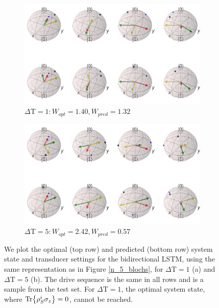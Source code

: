 \begin{figure}
	\centering
	\begin{subfigure}{0.85\textwidth}
		\centering
		\includegraphics[width=\textwidth]{img/bloch_comp_1_crop_sphere}
		\caption{$\Delta \mathrm{T} = 1: W_{opt} = 1.40, W_{pred} = 1.32$}
		\label{}
	\end{subfigure}
	\begin{subfigure}{0.85\textwidth}
		\centering
		\includegraphics[width=\textwidth]{img/bloch_comp_5_crop_sphere}
		\caption{$\Delta \mathrm{T} = 5: W_{opt} = 2.42, W_{pred} = 0.57$}
		\label{}
	\end{subfigure}
	\caption{We plot the optimal (top row) and predicted (bottom row) system state and transducer settings for the bidirectional LSTM, using the same representation as in Figure \ref{n_5_blochs}, for $\Delta \mathrm{T} = 1$ (a) and $\Delta \mathrm{T} = 5$ (b). The drive sequence is the same in all rows and is a sample from the test set. For $\Delta \mathrm{T} = 1$, the optimal system state, where $\Tr{\rho_S^i \sigma_z} = 0$, cannot be reached.}
	\label{blochsdt15}
\end{figure}
